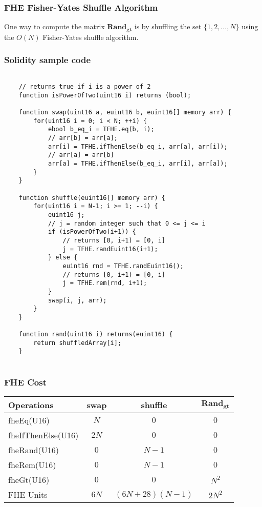 \subsubsection{FHE Fisher-Yates Shuffle Algorithm}
One way to compute the matrix $\mathbf{Rand_{gt}}$ is by shuffling the set $\{ 1, 2, \dots, N \}$ using the $O(N)$ Fisher-Yates shuffle algorithm.

\subsubsection{Solidity sample code}

\begin{lstlisting}[language=Solidity]

    // returns true if i is a power of 2
    function isPowerOfTwo(uint16 i) returns (bool);
    
    function swap(uint16 a, euint16 b, euint16[] memory arr) {
        for(uint16 i = 0; i < N; ++i) {
            ebool b_eq_i = TFHE.eq(b, i);
            // arr[b] = arr[a];
            arr[i] = TFHE.ifThenElse(b_eq_i, arr[a], arr[i]);
            // arr[a] = arr[b]
            arr[a] = TFHE.ifThenElse(b_eq_i, arr[i], arr[a]);
        }
    }
    
    function shuffle(euint16[] memory arr) {
        for(uint16 i = N-1; i >= 1; --i) {
            euint16 j;
            // j = random integer such that 0 <= j <= i
            if (isPowerOfTwo(i+1)) {
                // returns [0, i+1) = [0, i]
                j = TFHE.randEuint16(i+1);
            } else {
                euint16 rnd = TFHE.randEuint16();
                // returns [0, i+1) = [0, i]
                j = TFHE.rem(rnd, i+1);
            }
            swap(i, j, arr);
        }
    }
    
    function rand(uint16 i) returns(euint16) {
        return shuffledArray[i];
    }
        
\end{lstlisting}

\subsubsection{FHE Cost}

\renewcommand{\arraystretch}{1.5}
\begin{tabular}{ |l|c|c|c| }
    \hline    
    Operations & swap & shuffle & $\mathbf{Rand_{gt}}$ \\ 
    \hline
    fheEq(U16)          & $N$   & $0$      & $0$ \\
    fheIfThenElse(U16)  & $2N$  & $0$      & $0$ \\
    fheRand(U16)        & $0$   & $N-1$    & $0$ \\
    fheRem(U16)         & $0$   & $N-1$    & $0$ \\
    fheGt(U16)          & $0$   & $0$      & $N^2$ \\
    \hline
    \hline
    FHE Units           & $6N$  & $(6N + 28)(N-1)$ & $2N^2$ \\
    \hline
\end{tabular}

